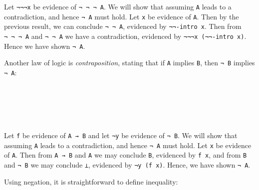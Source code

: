 Let \texttt{¬¬¬x} be evidence of \texttt{¬\ ¬\ ¬\ A}. We will show that
assuming \texttt{A} leads to a contradiction, and hence \texttt{¬\ A}
must hold. Let \texttt{x} be evidence of \texttt{A}. Then by the
previous result, we can conclude \texttt{¬\ ¬\ A}, evidenced by
\texttt{¬¬-intro\ x}. Then from \texttt{¬\ ¬\ ¬\ A} and \texttt{¬\ ¬\ A}
we have a contradiction, evidenced by \texttt{¬¬¬x\ (¬¬-intro\ x)}.
Hence we have shown \texttt{¬\ A}.

Another law of logic is \emph{contraposition}, stating that if
\texttt{A} implies \texttt{B}, then \texttt{¬\ B} implies \texttt{¬\ A}:

\begin{fence}
\begin{code}%
\>[0]\AgdaSpace{}%
\AgdaSymbol{:}\AgdaSpace{}%
\AgdaSpace{}%
\AgdaSymbol{\{}\AgdaSpace{}%
\AgdaSpace{}%
\AgdaSymbol{:}\AgdaSpace{}%
\AgdaSymbol{\}}\<%
\\
\>[0][@{}l@{\AgdaIndent{0}}]%
\>[2]%
\>[108I]\AgdaSymbol{(}\AgdaSpace{}%
\AgdaSpace{}%
\AgdaSymbol{)}\<%
\\
\>[.][@{}l@{}]\<[108I]%
\>[4]\AgdaComment{-----------}\<%
\\
%
\>[2]\AgdaSpace{}%
\AgdaSymbol{(}\AgdaSpace{}%
\AgdaSpace{}%
\AgdaSpace{}%
\AgdaSpace{}%
\AgdaSymbol{)}\<%
\\
\>[0]\AgdaSpace{}%
\AgdaSpace{}%
\AgdaSpace{}%
\AgdaSpace{}%
\AgdaSymbol{=}\AgdaSpace{}%
\AgdaSpace{}%
\AgdaSymbol{(}\AgdaSpace{}%
\AgdaSymbol{)}\<%
\end{code}
\end{fence}

Let \texttt{f} be evidence of \texttt{A\ →\ B} and let \texttt{¬y} be
evidence of \texttt{¬\ B}. We will show that assuming \texttt{A} leads
to a contradiction, and hence \texttt{¬\ A} must hold. Let \texttt{x} be
evidence of \texttt{A}. Then from \texttt{A\ →\ B} and \texttt{A} we may
conclude \texttt{B}, evidenced by \texttt{f\ x}, and from \texttt{B} and
\texttt{¬\ B} we may conclude \texttt{⊥}, evidenced by
\texttt{¬y\ (f\ x)}. Hence, we have shown \texttt{¬\ A}.

Using negation, it is straightforward to define inequality:


